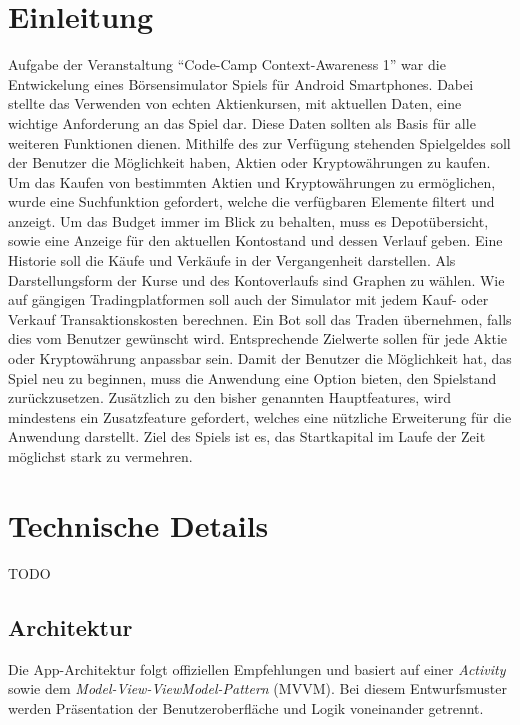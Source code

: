 \documentclass[a4paper]{article}
\begin{document}
\section{Einleitung}
\label{sec:introduction}
Aufgabe der Veranstaltung "`Code-Camp Context-Awareness 1"' war die Entwickelung eines Börsensimulator Spiels für Android Smartphones. Dabei stellte das Verwenden von echten Aktienkursen, mit aktuellen Daten, eine wichtige Anforderung an das Spiel dar. Diese Daten sollten als Basis für alle weiteren Funktionen dienen. Mithilfe des zur Verfügung stehenden Spielgeldes soll der Benutzer die Möglichkeit haben, Aktien oder Kryptowährungen zu kaufen. Um das Kaufen von bestimmten Aktien und Kryptowährungen zu ermöglichen, wurde eine Suchfunktion gefordert, welche die verfügbaren Elemente filtert und anzeigt. Um das Budget immer im Blick zu behalten, muss es Depotübersicht, sowie eine Anzeige für den aktuellen Kontostand und dessen Verlauf geben. Eine Historie soll die Käufe und Verkäufe in der Vergangenheit darstellen. Als Darstellungsform der Kurse und des Kontoverlaufs sind Graphen zu wählen. Wie auf gängigen Tradingplatformen soll auch der Simulator mit jedem Kauf- oder Verkauf Transaktionskosten berechnen. Ein Bot soll das Traden übernehmen, falls dies vom Benutzer gewünscht wird. Entsprechende Zielwerte sollen für jede Aktie oder Kryptowährung anpassbar sein. Damit der Benutzer die Möglichkeit hat, das Spiel neu zu beginnen, muss die Anwendung eine Option bieten, den Spielstand zurückzusetzen. Zusätzlich zu den bisher genannten Hauptfeatures, wird mindestens ein Zusatzfeature gefordert, welches eine nützliche Erweiterung für die Anwendung darstellt. Ziel des Spiels ist es, das Startkapital im Laufe der Zeit möglichst stark zu vermehren.


\section{Technische Details}
\label{sec:technologies}
TODO


\subsection{Architektur}
\label{subsec:technologies:architecture}
Die App-Architektur folgt offiziellen Empfehlungen\autocite{google_recommendations} und basiert auf einer \textit{Activity} sowie dem \textit{Model-View-ViewModel-Pattern} (MVVM).
Bei diesem Entwurfsmuster werden Präsentation der Benutzeroberfläche und Logik voneinander getrennt.
\end{document}
